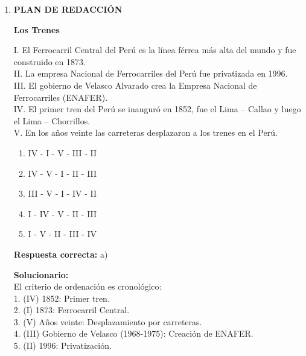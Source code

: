 \begin{enumerate}
\textbf{Respuesta correcta:} e)

\vspace{2mm}
\textbf{Solucionario:}\\
La analogía es de Sujeto : Lugar de trabajo o acción. Un ingeniero desempeña sus funciones técnicas frecuentemente en una mina; del mismo modo, un geólogo realiza sus estudios de campo y análisis profesional predominantemente en la montaña.
	
	
	
	\item \textbf{PLAN DE REDACCIÓN}
	
	\begin{center}
		\textbf{Los Trenes}
	\end{center}
	
	I. El Ferrocarril Central del Perú es la línea férrea más alta del mundo y fue construido en 1873. \\
	II. La empresa Nacional de Ferrocarriles del Perú fue privatizada en 1996. \\
	III. El gobierno de Velasco Alvarado crea la Empresa Nacional de Ferrocarriles (ENAFER). \\
	IV. El primer tren del Perú se inauguró en 1852, fue el Lima – Callao y luego el Lima – Chorrillos. \\
	V. En los años veinte las carreteras desplazaron a los trenes en el Perú.
	
	\begin{enumerate}[label=\alph*)]
		\item IV - I - V - III - II
		\item IV - V - I - II - III
		\item III - V - I - IV - II
		\item I - IV - V - II - III
		\item I - V - II - III - IV
	\end{enumerate}
	
	\textbf{Respuesta correcta:} a)
	
	\vspace{2mm}
	\textbf{Solucionario:}\\
	El criterio de ordenación es cronológico:\\
	1. (IV) 1852: Primer tren.\\
	2. (I) 1873: Ferrocarril Central.\\
	3. (V) Años veinte: Desplazamiento por carreteras.\\
	4. (III) Gobierno de Velasco (1968-1975): Creación de ENAFER.\\
	5. (II) 1996: Privatización.\\	
	

\end{enumerate}
